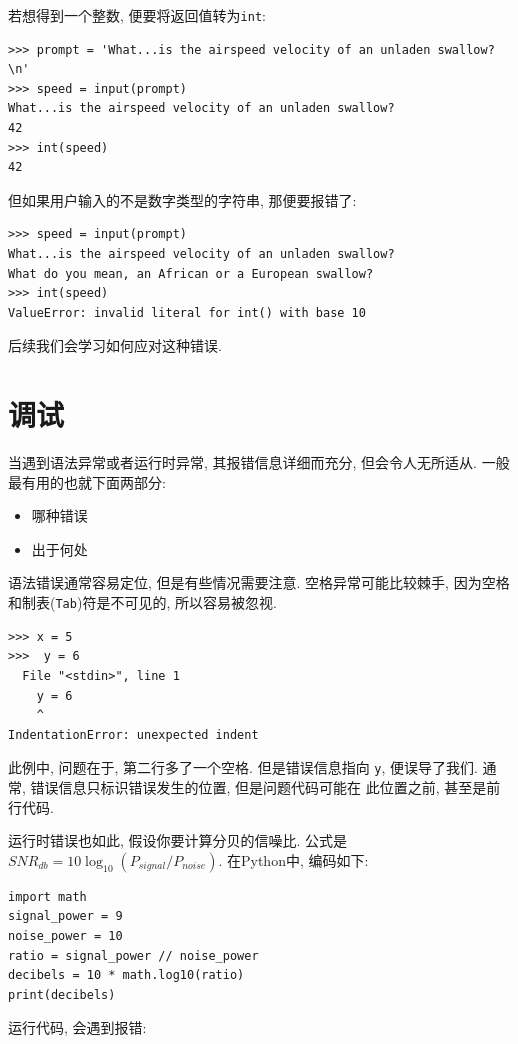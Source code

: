 \documentclass[10pt]{book}
\begin{document}
若想得到一个整数, 便要将返回值转为{\tt int}:

\begin{verbatim}
>>> prompt = 'What...is the airspeed velocity of an unladen swallow?\n'
>>> speed = input(prompt)
What...is the airspeed velocity of an unladen swallow?
42
>>> int(speed)
42
\end{verbatim}
%
但如果用户输入的不是数字类型的字符串, 那便要报错了:

\begin{verbatim}
>>> speed = input(prompt)
What...is the airspeed velocity of an unladen swallow?
What do you mean, an African or a European swallow?
>>> int(speed)
ValueError: invalid literal for int() with base 10
\end{verbatim}
%
后续我们会学习如何应对这种错误. 


\section{调试}
\label{whitespace}

当遇到语法异常或者运行时异常, 其报错信息详细而充分, 
但会令人无所适从. 一般最有用的也就下面两部分:

\begin{itemize}

\item 哪种错误

\item 出于何处

\end{itemize}

语法错误通常容易定位, 但是有些情况需要注意. 
空格异常可能比较棘手, 因为空格和制表({\tt Tab})符是不可见的, 所以容易被忽视. 

\begin{verbatim}
>>> x = 5
>>>  y = 6
  File "<stdin>", line 1
    y = 6
    ^
IndentationError: unexpected indent
\end{verbatim}
%
此例中, 问题在于, 第二行多了一个空格. 
但是错误信息指向 {\tt y}, 便误导了我们. 
通常, 错误信息只标识错误发生的位置, 但是问题代码可能在
此位置之前, 甚至是前行代码. 

运行时错误也如此, 假设你要计算分贝的信噪比. 
公式是$SNR_{db} = 10 \log_{10} (P_{signal} / P_{noise})$. 
在Python中, 编码如下:

\begin{verbatim}
import math
signal_power = 9
noise_power = 10
ratio = signal_power // noise_power
decibels = 10 * math.log10(ratio)
print(decibels)
\end{verbatim}
%
运行代码, 会遇到报错:
%
\end{document}
